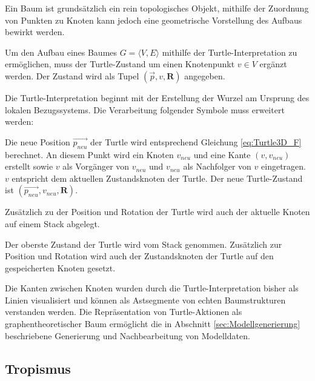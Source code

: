 Ein Baum ist grundsätzlich ein rein topologisches Objekt, mithilfe der Zuordnung von Punkten zu Knoten kann jedoch eine geometrische Vorstellung des Aufbaus bewirkt werden. \cite[S.23]{ABOP:04}

 Um den Aufbau eines Baumes $G = \langle V,E \rangle$ mithilfe der Turtle-Interpretation zu ermöglichen, muss der Turtle-Zustand um einen Knotenpunkt $v \in V$ ergänzt werden. Der Zustand wird als Tupel $(\overrightarrow{p}, v, \boldsymbol{R})$ angegeben. 
 
 Die Turtle-Interpretation beginnt mit der Erstellung der Wurzel am Ursprung des lokalen Bezugssystems. Die Verarbeitung folgender Symbole muss erweitert werden:

\begin{description}[labelindent]
		\item[\boldmath$F(l)$]  Die neue Position $\overrightarrow{p_{neu}}$ der Turtle wird entsprechend Gleichung \ref{eq:Turtle3D_F} berechnet. An diesem Punkt wird ein Knoten $v_{neu}$ und eine Kante $(v,v_{neu})$ erstellt sowie $v$ als Vorgänger von $v_{neu}$ und $v_{neu}$ als Nachfolger von $v$ eingetragen. $v$ entspricht dem aktuellen Zustandsknoten der Turtle. Der neue Turtle-Zustand ist $(\overrightarrow{p_{neu}}, v_{neu}, \boldsymbol{R})$.  \\
	
	\item[\boldmath$\textbf{[}$] Zusätzlich zu der Position und Rotation der Turtle wird auch der aktuelle Knoten auf einem Stack abgelegt.\\
	
	\item[\boldmath$\textbf{]}$] Der oberste Zustand der Turtle wird vom Stack genommen. Zusätzlich zur Position und Rotation wird auch der Zustandsknoten der Turtle auf den gespeicherten Knoten gesetzt.\\
\end{description}

Die Kanten zwischen Knoten wurden durch die Turtle-Interpretation bisher als Linien visualisiert und können als Astsegmente von echten Baumstrukturen verstanden werden. \cite[S.23]{ABOP:04} Die Repräsentation von Turtle-Aktionen als graphentheoretischer Baum ermöglicht die in Abschnitt \ref{sec:Modellgenerierung} beschriebene Generierung und Nachbearbeitung von Modelldaten.

\subsection{Tropismus}

